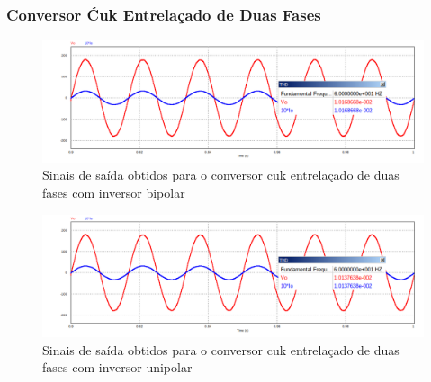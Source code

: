 \documentclass[
	12pt,				%
	openright,			%
	onseside,
	a4paper,			%
	english,			%
	french,				%
	spanish,			%
	brazil,				%
	]{abntex2}
\begin{document}
\subsubsection{Conversor Ćuk Entrelaçado de Duas Fases}

\begin{figure}[H]%
	\captionsetup{justification=centering}
	\centering
		\includegraphics[width=0.7 \linewidth]{interv_Vo_10Io_comp}
		\caption{Sinais de saída obtidos para o conversor cuk entrelaçado de duas fases com inversor bipolar}
		\label{fig:out_interv_bip}
\end{figure}

\begin{table}[H]
	\captionsetup{justification=centering}
	\centering
	\caption{Valores obtidos para o conversor cuk entrelaçado de duas fases com inversor bipolar}
	\label{tab:interv_bip_res}
\end{table}

\begin{figure}[H]%
	\captionsetup{justification=centering}
	\centering
		\includegraphics[width=0.7 \linewidth]{interv_Vo_10Io_comp_unip}
		\caption{Sinais de saída obtidos para o conversor cuk entrelaçado de duas fases com inversor unipolar}
		\label{fig:out_interv_unip}
\end{figure}
\end{document}
